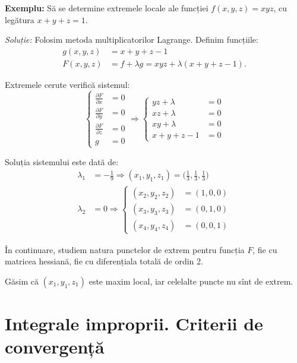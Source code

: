 \documentclass[11pt,a4paper]{article}
\theoremstyle{dotless}
\theoremstyle{dotlessdr}
\begin{document}
\textbf{Exemplu:} Să se determine extremele locale ale funcției $f(x,y,z) = xyz$,
cu legătura $x + y + z = 1$.

\emph{Soluție:} Folosim metoda multiplicatorilor Lagrange. Definim funcțiile:
\begin{align*}
  g(x, y, z) &= x + y + z - 1 \\
  F(x, y, z) &= f + \lambda g = xyz + \lambda(x + y + z - 1).
\end{align*}

Extremele cerute verifică sistemul:
\[
  \begin{cases}
    \frac{\partial F}{\partial x} &= 0 \\
    \frac{\partial F}{\partial y} &= 0 \\
    \frac{\partial F}{\partial z} &= 0 \\
    g &= 0
  \end{cases} \Rightarrow
  \begin{cases}
    yz + \lambda &= 0 \\
    xz + \lambda &= 0 \\
    xy + \lambda &= 0 \\
    x + y + z - 1 &= 0
  \end{cases}
\]

Soluția sistemului este dată de:
\begin{align*}
  \lambda_1 &= -\frac{1}{9} \Rightarrow %
              (x_1, y_1, z_1) = \big(\frac{1}{3}, \frac{1}{3}, \frac{1}{3}\big) \\
  \lambda_2 &= 0 \Rightarrow
              \begin{cases}
                (x_2, y_2, z_2) &= (1, 0, 0) \\
                (x_3, y_3, z_3) &= (0, 1, 0) \\
                (x_4, y_4, z_4) &= (0, 0, 1)
              \end{cases}
\end{align*}

În continuare, studiem natura punctelor de extrem pentru funcția $F$, fie cu
matricea hessiană, fie cu diferențiala totală de ordin 2.

Găsim că $(x_1, y_1, z_1)$ este maxim local, iar celelalte puncte nu sînt
de extrem.


\section{Integrale improprii. Criterii de convergență}
\label{sec:int-imp}
\end{document}
